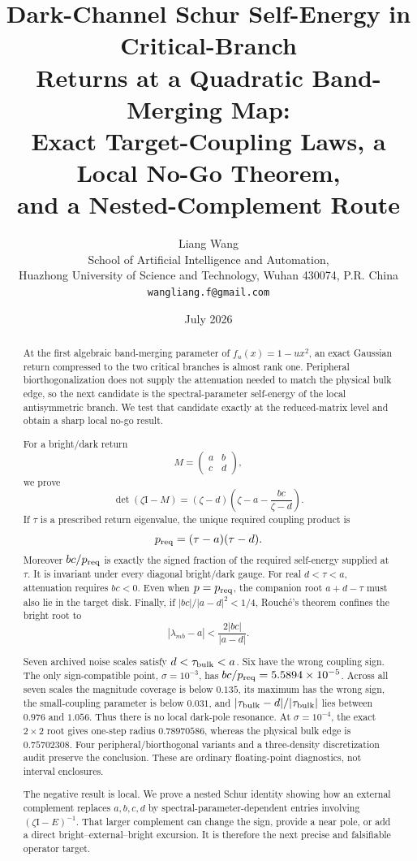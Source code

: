 \documentclass[11pt]{article}
\title{\textbf{Dark-Channel Schur Self-Energy in Critical-Branch}\\
\textbf{Returns at a Quadratic Band-Merging Map:}\\[0.35em]
\large Exact Target-Coupling Laws, a Local No-Go Theorem,\\
and a Nested-Complement Route}
\author{Liang Wang\\
\small School of Artificial Intelligence and Automation,\\[-0.2em]
\small Huazhong University of Science and Technology, Wuhan 430074, P.R. China\\
\small \texttt{wangliang.f@gmail.com}}
\date{July 2026}
\theoremstyle{definition}
\theoremstyle{remark}
\newcommand{\Id}{\mathrm I}
\begin{document}
\maketitle

\begin{abstract}
At the first algebraic band-merging parameter of $f_u(x)=1-u x^2$, an exact
Gaussian return compressed to the two critical branches is almost rank one.
Peripheral biorthogonalization does not supply the attenuation needed to
match the physical bulk edge, so the next candidate is the
spectral-parameter self-energy of the local antisymmetric branch.  We test
that candidate exactly at the reduced-matrix level and obtain a sharp local
no-go result.

For a bright/dark return
\[
 M=\begin{pmatrix}a&b\\c&d\end{pmatrix},
\]
we prove
\[
 \det(\zeta\Id-M)
 = (\zeta-d)\left(\zeta-a-\frac{bc}{\zeta-d}\right).
\]
If $\tau$ is a prescribed return eigenvalue, the unique required coupling
product is
\[
 p_{\rm req}=(\tau-a)(\tau-d).
\]
Moreover $bc/p_{\rm req}$ is exactly the signed fraction of the required
self-energy supplied at $\tau$.  It is invariant under every diagonal
bright/dark gauge.  For real $d<\tau<a$, attenuation requires $bc<0$.  Even
when $p=p_{\rm req}$, the companion root $a+d-\tau$ must also lie in the
target disk.  Finally, if $|bc|/|a-d|^2<1/4$, Rouch\'e's theorem confines the
bright root to
\[
 |\lambda_{
m b}-a|<\frac{2|bc|}{|a-d|}.
\]

Seven archived noise scales satisfy $d<\tau_{\rm bulk}<a$.  Six have the
wrong coupling sign.  The only sign-compatible point, $\sigma=10^{-3}$,
has $bc/p_{\rm req}=5.5894\times10^{-5}$.  Across all seven scales the
magnitude coverage is below $0.135$, its maximum has the wrong sign, the
small-coupling parameter is below $0.031$, and
$|\tau_{\rm bulk}-d|/|\tau_{\rm bulk}|$ lies between $0.976$ and $1.056$.
Thus there is no local dark-pole resonance.  At $\sigma=10^{-4}$, the exact
$2\times2$ root gives one-step radius $0.78970586$, whereas the physical
bulk edge is $0.75702308$.  Four peripheral/biorthogonal variants and a
three-density discretization audit preserve the conclusion.  These are
ordinary floating-point diagnostics, not interval enclosures.

The negative result is local.  We prove a nested Schur identity showing how
an external complement replaces $a,b,c,d$ by
spectral-parameter-dependent entries involving $(\zeta\Id-E)^{-1}$.  That
larger complement can change the sign, provide a near pole, or add a direct
bright--external--bright excursion.  It is therefore the next precise and
falsifiable operator target.
\end{abstract}
\end{document}
